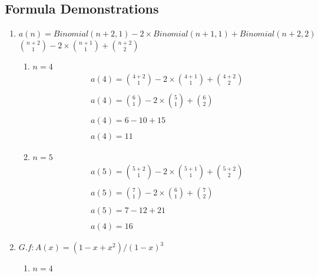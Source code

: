 \documentclass[a4paper,10pt]{article}
\begin{document}
\subsection{Formula Demonstrations}
	\begin{enumerate}
  \item $a(n) = Binomial(n+2,1)-2\times Binomial(n+1,1)+Binomial(n+2,2)$\\

  \hspace{1cm}${n+2 \choose 1} - 2\times {n+1 \choose 1} + {n+2 \choose 2}$\\
  \begin{enumerate}
    \item $n = 4$
    \[
     \boxed{ 
	  \begin{gathered}
       	a(4) = {4+2 \choose 1} - 2\times {4+1 \choose 1} + {4+2 \choose 2}\\
		\\ 
       	a(4) = {6 \choose 1} - 2\times {5 \choose 1} + {6 \choose 2} \\
       	\\
       	a(4) = 6 - 10 + 15\\
       	\\
       	a(4) = 11 
      \end{gathered}	    
	  }
    \]	  
    \item $ n = 5$
    \[
     \boxed{ 
	  \begin{gathered}
       	a(5) = {5+2 \choose 1} - 2\times {5+1 \choose 1} + {5+2 \choose 2}\\
		\\ 
       	a(5) = {7 \choose 1} - 2\times {6 \choose 1} + {7 \choose 2} \\
       	\\
       	a(5) = 7 - 12 + 21\\
       	\\
       	a(4) = 16 
      \end{gathered}	    
	  }
    \]	
  \end{enumerate}
  \item $G.f : A(x) = (1-x+x^2)/(1-x)^3$
  \begin{enumerate}
    \item $n = 4$
    \[
     \boxed{ 
	  \begin{gathered}

\end{gathered}}\]
\end{enumerate}
\end{enumerate}
\end{document}
